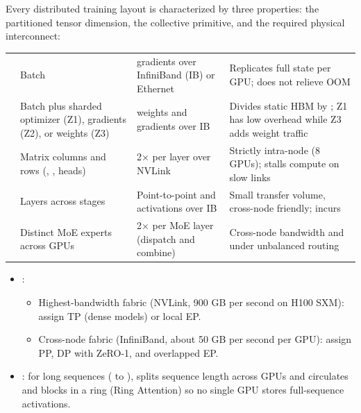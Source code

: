 Every distributed training layout is characterized by three properties: the partitioned tensor dimension, the collective primitive, and the required physical interconnect:

\par\vspace{4pt}\noindent\begin{minipage}{\linewidth}
\small
\begin{tabularx}{\linewidth}{@{}l Y Y Y@{}}
\toprule
{} &  &  &  \\
\midrule
{} & Batch  &  gradients over InfiniBand (IB) or Ethernet & Replicates full  state per GPU; does not relieve OOM \\
 & Batch  plus sharded optimizer (Z1), gradients (Z2), or weights (Z3) &  weights and  gradients over IB & Divides static HBM by ; Z1 has low overhead while Z3 adds weight traffic \\
 & Matrix columns and rows (, , heads) & 2$\times$  per layer over NVLink & Strictly intra-node (8 GPUs); stalls compute on slow links \\
 & Layers  across stages & Point-to-point  and  activations over IB & Small transfer volume, cross-node friendly; incurs  \\
 & Distinct MoE experts across GPUs & 2$\times$  per MoE layer (dispatch and combine) & Cross-node bandwidth and  under unbalanced routing \\
\bottomrule
\end{tabularx}
\end{minipage}\par\vspace{4pt}

\begin{itemize}
    \item {}:
    \begin{itemize}
        \item Highest-bandwidth fabric (NVLink, 900 GB per second on H100 SXM): assign TP (dense models) or local EP.
        \item Cross-node fabric (InfiniBand, about 50 GB per second per GPU): assign PP, DP with ZeRO-1, and overlapped EP.
    \end{itemize}
    \item {}: for long sequences ( to ), splits sequence length  across GPUs and circulates  and  blocks in a ring (Ring Attention) so no single GPU stores full-sequence activations.
\end{itemize}

